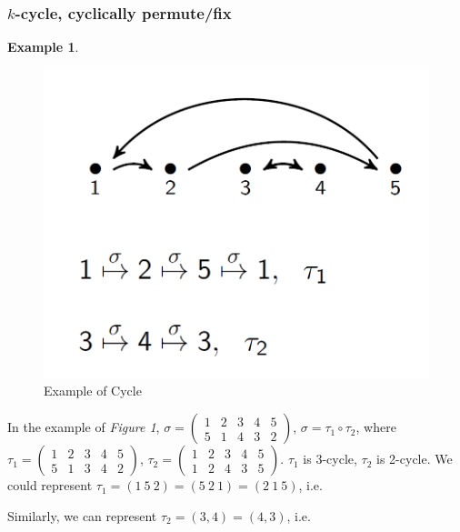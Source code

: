 \documentclass[11pt,a4paper]{article}
\newtheorem{example}{Example}
\begin{document}
\subsubsection{$k$-cycle, cyclically permute/fix}
\begin{example}
\end{example}
\begin{center}
\begin{figure}[htbp]
    \centering
    \includegraphics[scale=0.5]{Cycle.png}
    \caption{Example of Cycle}
\end{figure}
\end{center}
In the example of \textit{Figure 1}, $\sigma=\begin{pmatrix}
    1&2&3&4&5\\
    5&1&4&3&2
\end{pmatrix}$, $\sigma=\tau_1\circ\tau_2$, where $\tau_1=\begin{pmatrix}
    1&2&3&4&5\\
    5&1&3&4&2
\end{pmatrix}$, $\tau_2=\begin{pmatrix}
    1&2&3&4&5\\
    1&2&4&3&5
\end{pmatrix}$. $\tau_1$ is 3-cycle, $\tau_2$ is 2-cycle.
We could represent $\tau_1=(1\ 5\ 2)=(5\ 2\ 1)=(2\ 1\ 5)$, i.e.
Similarly, we can represent $\tau_2=(3,4)=(4,3)$, i.e.
\end{document}
